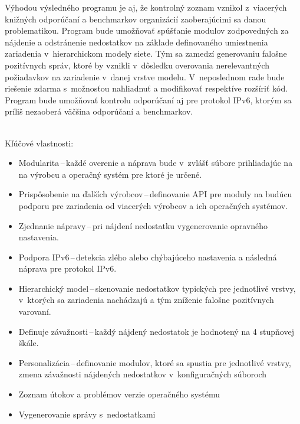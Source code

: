 Výhodou výsledného programu je aj, že kontrolný zoznam vznikol z~viacerých knižných odporúčaní a benchmarkov organizácií zaoberajúcimi sa danou problematikou. Program bude umožňovať spúšťanie modulov zodpovedných za nájdenie a odstránenie nedostatkov na základe definovaného umiestnenia zariadenia v~hierarchickom modely siete. Tým sa zamedzí generovaniu falošne pozitívnych správ, ktoré by vznikli v~dôsledku overovania nerelevantných požiadavkov na zariadenie v~danej vrstve modelu. V~neposlednom rade bude riešenie zdarma s~možnosťou nahliadnuť a modifikovať respektíve rozšíriť kód. Program bude umožňovať kontrolu odporúčaní aj pre protokol IPv6, ktorým sa príliš nezaoberá väčšina odporúčaní a benchmarkov.

\newpage
\noindent
\\
Kľúčové vlastnosti:

\begin{itemize}
	\item Modularita\,--\,každé overenie a náprava bude v~zvlášť súbore prihliadajúc na na výrobcu a operačný systém pre ktoré je určené.
	\vspace{0.5em}
	\item Prispôsobenie na ďalších výrobcov\,--\,definovanie API pre moduly na budúcu podporu pre zariadenia od viacerých výrobcov a ich operačných systémov.
	\vspace{0.5em}
	\item Zjednanie nápravy\,--\,pri nájdení nedostatku vygenerovanie opravného nastavenia.
	\vspace{0.5em}
	\item Podpora IPv6\,--\,detekcia zlého alebo chýbajúceho nastavenia a následná náprava pre protokol IPv6.
	\vspace{0.5em}
	\item Hierarchický model\,--\,skenovanie nedostatkov typických pre jednotlivé vrstvy, v~ktorých sa zariadenia nachádzajú a tým zníženie falošne pozitívnych varovaní.\vspace{0.5em}
	\item Definuje závažnosti\,--\,každý nájdený nedostatok je hodnotený na 4 stupňovej škále.
	\vspace{0.5em}
	\item Personalizácia\,--\,definovanie modulov, ktoré sa spustia pre jednotlivé vrstvy, zmena závažnosti nájdených nedostatkov v~konfiguračných súboroch
	\vspace{0.5em}
	\item Zoznam útokov a problémov verzie operačného systému
	\vspace{0.5em}
	\item Vygenerovanie správy s~nedostatkami
\end{itemize}

